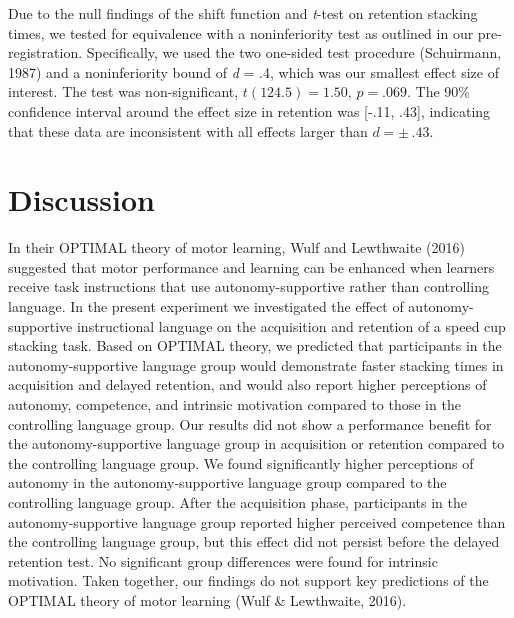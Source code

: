 \documentclass[
  man, donotrepeattitle,mask,floatsintext]{apa7}
\begin{document}
Due to the null findings of the shift function and \emph{t}-test on retention stacking times, we tested for equivalence with a noninferiority test as outlined in our pre-registration. Specifically, we used the two one-sided test procedure (Schuirmann, 1987) and a noninferiority bound of \emph{d} = .4, which was our smallest effect size of interest. The test was non-significant, \(t(124.5) = 1.50\), \(p = .069\). The 90\% confidence interval around the effect size in retention was {[}-.11, .43{]}, indicating that these data are inconsistent with all effects larger than \(d = \pm\,.43\).

\hypertarget{discussion}{%
\section{Discussion}\label{discussion}}

In their OPTIMAL theory of motor learning, Wulf and Lewthwaite (2016) suggested that motor performance and learning can be enhanced when learners receive task instructions that use autonomy-supportive rather than controlling language. In the present experiment we investigated the effect of autonomy-supportive instructional language on the acquisition and retention of a speed cup stacking task. Based on OPTIMAL theory, we predicted that participants in the autonomy-supportive language group would demonstrate faster stacking times in acquisition and delayed retention, and would also report higher perceptions of autonomy, competence, and intrinsic motivation compared to those in the controlling language group. Our results did not show a performance benefit for the autonomy-supportive language group in acquisition or retention compared to the controlling language group. We found significantly higher perceptions of autonomy in the autonomy-supportive language group compared to the controlling language group. After the acquisition phase, participants in the autonomy-supportive language group reported higher perceived competence than the controlling language group, but this effect did not persist before the delayed retention test. No significant group differences were found for intrinsic motivation. Taken together, our findings do not support key predictions of the OPTIMAL theory of motor learning (Wulf \& Lewthwaite, 2016).
\end{document}
